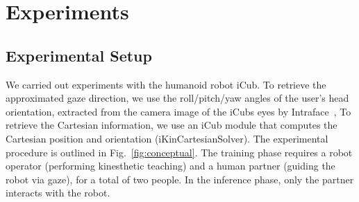 \documentclass[runningheads,a4paper]{llncs}
\begin{document}
\section{Experiments}
\label{sec:xp}
\subsection{Experimental Setup}
We carried out experiments with the humanoid robot iCub.
To retrieve the approximated gaze direction, we use the roll/pitch/yaw angles of the user's head orientation, extracted from the camera image of the iCubs eyes by Intraface~\cite{XiongD13}, 
To retrieve the Cartesian information, we use an iCub module that computes the
Cartesian position and orientation (iKinCartesianSolver). 
The experimental procedure is outlined in 
Fig.~\ref{fig:conceptual}.
The training phase requires a robot operator (performing kinesthetic teaching) and a human partner (guiding the robot via gaze), for a total of two people. In the inference phase, only the partner interacts with the robot.
\end{document}
